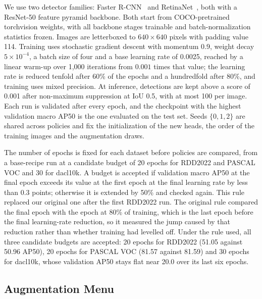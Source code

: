 \documentclass[conference]{IEEEtran}
\begin{document}
We use two detector families: Faster R-CNN~\cite{ren2017faster} and RetinaNet~\cite{lin2017focal}, both with a ResNet-50 feature pyramid backbone. Both start from COCO-pretrained torchvision weights, with all backbone stages trainable and batch-normalization statistics frozen. Images are letterboxed to $640\times640$ pixels with padding value 114. Training uses stochastic gradient descent with momentum 0.9, weight decay $5\times10^{-4}$, a batch size of four and a base learning rate of 0.0025, reached by a linear warm-up over 1,000 iterations from $0.001$ times that value; the learning rate is reduced tenfold after 60\% of the epochs and a hundredfold after 80\%, and training uses mixed precision. At inference, detections are kept above a score of 0.001 after non-maximum suppression at IoU 0.5, with at most 100 per image. Each run is validated after every epoch, and the checkpoint with the highest validation macro AP50 is the one evaluated on the test set. Seeds $\{0,1,2\}$ are shared across policies and fix the initialization of the new heads, the order of the training images and the augmentation draws.

The number of epochs is fixed for each dataset before policies are compared, from a base-recipe run at a candidate budget of 20 epochs for RDD2022 and PASCAL VOC and 30 for dacl10k. A budget is accepted if validation macro AP50 at the final epoch exceeds its value at the first epoch at the final learning rate by less than 0.3 points; otherwise it is extended by 50\% and checked again. This rule replaced our original one after the first RDD2022 run. The original rule compared the final epoch with the epoch at 80\% of training, which is the last epoch before the final learning-rate reduction, so it measured the jump caused by that reduction rather than whether training had levelled off. Under the rule used, all three candidate budgets are accepted: 20 epochs for RDD2022 (51.05 against 50.96 AP50), 20 epochs for PASCAL VOC (81.57 against 81.59) and 30 epochs for dacl10k, whose validation AP50 stays flat near 20.0 over its last six epochs.

\subsection{Augmentation Menu}
\label{sec:setup_menu}
\end{document}
